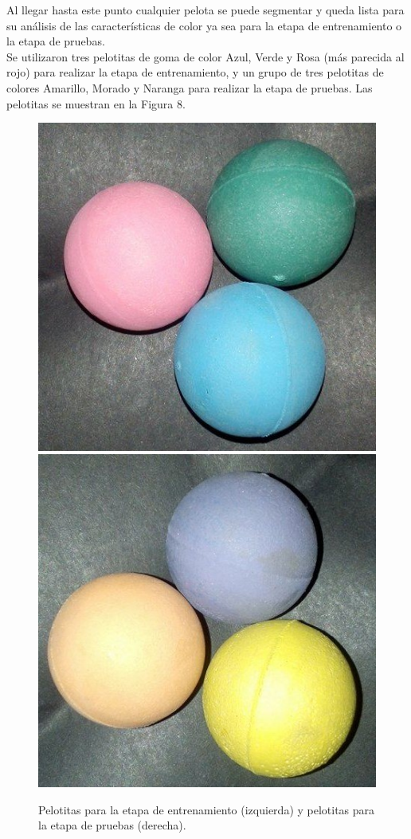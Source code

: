 \documentclass[conference]{IEEEtran}
\begin{document}
Al llegar hasta este punto cualquier pelota se puede segmentar y queda lista para su an\'alisis de las caracter\'isticas de color ya sea para la etapa de entrenamiento o la etapa de pruebas.\\

Se utilizaron tres pelotitas de goma de color Azul, Verde y Rosa (m\'as parecida al rojo) para realizar la etapa de entrenamiento, y un grupo de tres pelotitas de colores Amarillo, Morado y Naranga para realizar la etapa de pruebas. Las pelotitas se muestran en la Figura 8.

\begin{figure}[h]
	\setlength{\unitlength}{0.0105in}
	\centering
	\includegraphics[scale=0.26]{./images/balls1.jpg}
	\includegraphics[scale=0.25]{./images/balls2.jpg}
	\caption{ Pelotitas para la etapa de entrenamiento (izquierda) y pelotitas para la etapa de pruebas (derecha). }	
\end{figure}
\end{document}
